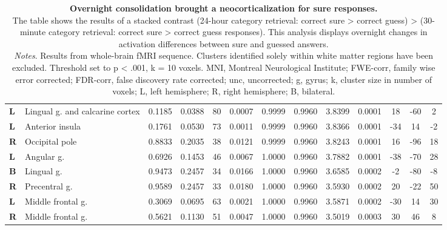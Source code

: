 \begin{landscape}
\begin{fullwidth}
\begin{table}[!ht]
\begin{tabular}{ll|cccc|cccc|ccc}
        \textbf{L} & Lingual g. and calcarine cortex & 0.1185 & 0.0388 & 80 & 0.0007 & 0.9999 & 0.9960 & 3.8399 & 0.0001 & 18 & -60 & 2 \\
        \textbf{L} & Anterior insula & 0.1761 & 0.0530 & 73 & 0.0011 & 0.9999 & 0.9960 & 3.8366 & 0.0001 & -34 & 14 & -2 \\
        \textbf{R} & Occipital pole & 0.8833 & 0.2035 & 38 & 0.0121 & 0.9999 & 0.9960 & 3.8243 & 0.0001 & 16 & -96 & 18 \\
        \textbf{L} & Angular g. & 0.6926 & 0.1453 & 46 & 0.0067 & 1.0000 & 0.9960 & 3.7882 & 0.0001 & -38 & -70 & 28 \\
        \textbf{B} & Lingual g. & 0.9473 & 0.2457 & 34 & 0.0166 & 1.0000 & 0.9960 & 3.6585 & 0.0002 & -2 & -80 & -8 \\
        \textbf{R} & Precentral g. & 0.9589 & 0.2457 & 33 & 0.0180 & 1.0000 & 0.9960 & 3.5930 & 0.0002 & 20 & -22 & 50 \\
        \textbf{L} & Middle frontal g. & 0.3069 & 0.0695 & 63 & 0.0021 & 1.0000 & 0.9960 & 3.5871 & 0.0002 & -30 & 14 & 30 \\
        \textbf{R} & Middle frontal g. & 0.5621 & 0.1130 & 51 & 0.0047 & 1.0000 & 0.9960 & 3.5019 & 0.0003 & 30 & 46 & 8 \\ \hline
    \end{tabular}
    \vspace{1.0 em}
    \caption{\textbf{Overnight consolidation brought a neocorticalization for sure responses.} \\ 
    The table shows the results of a stacked contrast (24-hour category retrieval: correct sure > correct guess) > (30-minute category retrieval: correct sure > correct guess responses). This analysis displays overnight changes in activation differences between sure and guessed answers. \\ 
    \vspace{1.0 em} \textit{Notes}. Results from whole-brain fMRI sequence. Clusters identified solely within white matter regions have been excluded. Threshold set to p < .001, k = 10 voxels. MNI, Montreal Neurological Institute; FWE-corr, family wise error corrected; FDR-corr, false discovery rate corrected; unc, uncorrected; g, gyrus; k, cluster size in number of voxels; L, left hemisphere; R, right hemisphere; B, bilateral.}
\label{tab:Retrieval2_Sure_vs_Guess_Day2>Day1}
\end{table}
\end{fullwidth}
\end{landscape}
